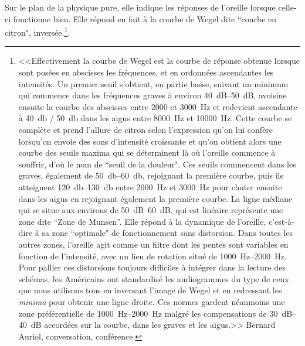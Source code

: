 Sur le plan de la physique pure, elle indique les réponses de l'oreille
lorsque celle-ci fonctionne bien. Elle répond en fait à la courbe
de Wegel dite ``courbe en citron", inversée.\footnote{%
		<<Effectivement la courbe de Wegel est la courbe de réponse obtenue
lorsque sont posées en abscisses les fréquences, et en ordonnées ascendantes
les intensités. Un premier seuil s'obtient, en partie basse, suivant
un minimum qui commence dans les fréquences graves à environ 
\SIrange{40}{50}{\dB}, avoisine ensuite la courbe des abscisses entre 2000 et \SI{3000}{\Hz}
et redevient ascendante à \SI{40}{\decibel} / \SI{50}{\decibel} dans les aigus entre \SI{8000}{\Hz} et
\SI{10000}{\Hz}. Cette courbe se complète et prend l'allure de citron selon
l'expression qu'on lui confère lorsqu'on envoie des
sons d'intensité croissante et qu'on obtient alors une courbe des
seuils maxima qui se déterminent là où l'oreille commence à souffrir,
d'où le nom de ``seuil de la douleur". Ces seuils
commencent dans les graves, également de \SIrange{50}{60}{\decibel}, rejoignant la première
courbe, puis ils atteignent \SIrange{120}{130}{\decibel} entre \SI{2000}{\Hz} et \SI{3000}{\Hz} pour
chuter ensuite dans les aigus en rejoignant également la première
courbe. La ligne médiane qui se situe aux environs de \SIrange{50}{60}{\dB}, qui
est linéaire représente une zone dite ``Zone de Munsen''.
Elle répond à la dynamique de l'oreille, c'est-à-dire
à sa zone ``optimale" de fonctionnement sans
distorsion. Dans toutes les autres zones, l'oreille
agit comme un filtre dont les pentes sont variables en fonction de
l'intensité, avec un lieu de rotation situé de \SIrange{1000}{2000}{\Hz}. Pour pallier ces distorsions toujours difficiles à intégrer
dans la lecture des schémas, les Américains ont standardisé les audiogrammes
du type de ceux que nous utilisons tous en inversant l'image
de Wegel et en redressant les \emph{minima} pour obtenir une ligne droite.
Ces normes gardent néanmoins une zone préférentielle de \SIrange{1000}{2000}{\Hz} malgré les compensations de \SIrange{30}{40}{\dB} accordées sur la courbe,
dans les graves et les aigus.>> Bernard Auriol, conversation, conférence.}.

